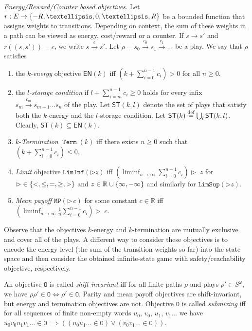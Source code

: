 \documentclass[a4paper,UKenglish,cleveref,autoref,thm-restate]{lipics-v2021}
\DeclareMathOperator{\Term}{\mathtt{Term}}
\newcommand{\LimInf}[2]{\mathtt{LimInf}(#1 #2)}
\newcommand{\LimSup}[2]{\mathtt{LimSup}(#1 #2)}
\newcommand{\MP}[2]{\mathtt{MP}(#1\, #2)}
\newcommand{\energymove}[1]{\stackrel{#1}{\movesto}}
\newcommand{\tendsto}{\rightarrow}
\DeclarePairedDelimiter{\set}{\{}{\}}
\newcommand{\+}[1]{\mathbb{#1}}
\newcommand{\?}[1]{\mathcal{#1}}
\newcommand{\R}{\+{R}}
\newcommand{\eqby}[2][=]{\stackrel{\text{{\tiny{#2}}}}{#1}}
\newcommand{\eqdef}{\eqby{def}}
\newcommand{\obj}{\mathtt{O}}
\newcommand{\lrc}[1]{\left(#1\right)}
\newcommand{\states}{S}
\newcommand{\s}{s}
\newcommand{\movesto}{{\longrightarrow}}
\newcommand{\play}{\rho}
\newcommand{\partialplay}{\rho}
\newcommand{\EN}[1]{\mathsf{EN}(#1)}
\newcommand{\ES}[1]{\mathsf{ST}(#1)}
\begin{document}
\textit{Energy/Reward/Counter based objectives.}
Let $r: E \to \set{-R,\dots,0,\dots,R}$ be a bounded function that assigns weights
to transitions. Depending on context, the sum of these weights in a path
can be viewed as energy, cost/reward or a counter.
If $\s \movesto \s'$ and $r((\s,\s')) = c$, we write $\s \energymove{c}
\s'$. Let $\play = \s_0 \energymove{c_0} \s_1 \energymove{c_1} \ldots$ be a play.
We say that $\play$ satisfies
\begin{enumerate}
\item
  the $k$-\textit{energy} objective $\EN{k}$ iff $\lrc{k + \sum_{i=0}^{n-1} c_i} > 0$ for all $n \ge 0$.
\item
  the \emph{$l$-storage condition} if $l+\sum_{i=m}^{n-1} c_i \ge 0$
holds for every infix $s_m \energymove{c_m} \s_{m+1}\ldots s_n$ of the play.
Let $\ES{k,l}$ denote the set of plays that satisfy both the $k$-energy
and the $l$-storage condition. Let $\ES{k} \eqdef \bigcup_l \ES{k,l}$. Clearly, $\ES{k} \subseteq \EN{k}$.
\item
  $k$-\textit{Termination} $\Term(k)$ iff there exists $n \ge 0$ such that $\lrc{k + \sum_{i=0}^{n-1} c_i} \le 0$.
\item
  \textit{Limit} objective $\LimInf{\rhd}{z}$ iff
      $\lrc{\liminf_{n \tendsto \infty}\sum_{i=0}^{n-1} c_i } \rhd\; z$
      for $\rhd \in \set{<,\le,=,\ge,>}$ and $z \in \R \cup \set{\infty,-\infty}$ and similarly for $\LimSup{\rhd}{z}$.
\item
      \textit{Mean payoff} $\MP{\rhd}{c}$ for some constant $c \in \R$
      iff $\lrc{\liminf_{n \tendsto \infty}\frac{1}{n}\sum_{i=0}^{n-1} c_i } \rhd\; c$.
\end{enumerate}
Observe that the objectives $k$-energy and $k$-termination are mutually
exclusive and cover all of the plays.
A different way to consider these objectives is to encode the energy level
(the sum of the transition weights so far) into the state space and
then consider the obtained infinite-state game with safety/reachability objective, respectively.

An objective $\obj$ is called \textit{shift-invariant}
iff for all finite paths $\partialplay$ and plays $\play' \in \states^{\omega}$,
we have $\partialplay \play' \in \obj \iff \play' \in \obj$.
Parity and mean payoff objectives are shift-invariant, but energy and
termination objectives are not.
Objective $\obj$ is called \textit{submixing} iff for all sequences of finite
non-empty words $u_0$, $v_0$, $u_1$, $v_1 \ldots$ we have
$u_0v_0u_1v_1 \ldots \in \obj \implies \left((u_0u_1\ldots \in \obj) \vee (v_0v_1 \ldots \in \obj)\right)$.
\end{document}
